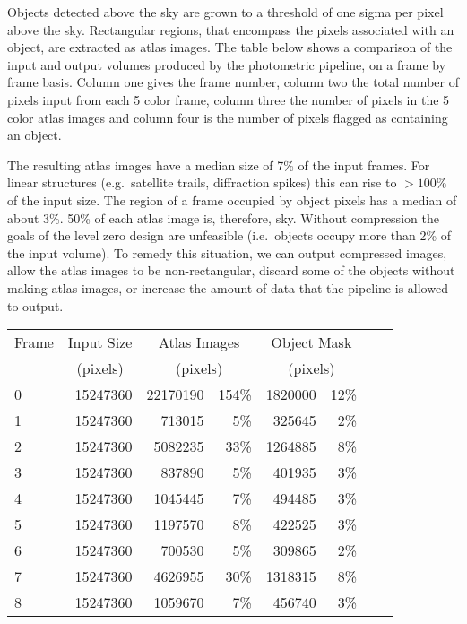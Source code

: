 \begin{itemize}
Objects detected above the sky are grown to a threshold of one sigma
per pixel above the sky. Rectangular regions, that encompass the
pixels associated with an object, are extracted as atlas images. The
table below shows a comparison of the input and output volumes
produced by the photometric pipeline, on a frame by frame basis.
Column one gives the frame number, column two the total number of
pixels input from each 5 color frame, column three the number of
pixels in the 5 color atlas images and column four is the number of
pixels flagged as containing an object.

The resulting atlas images have a median size of 7\% of the input
frames. For linear structures (e.g.\ satellite trails, diffraction
spikes) this can rise to $>100\%$ of the input size. The region of a
frame occupied by object pixels has a median of about 3\%. 50\% of
each atlas image is, therefore, sky. Without compression the goals of
the level zero design are unfeasible (i.e.\ objects occupy more than
2\% of the input volume). To remedy this situation, we can
output compressed images, allow the atlas images to be non-rectangular,
discard some of the objects without making atlas images, or increase
the amount of data that the pipeline is allowed to output.

\begin{tabular}{l|r|rr|rr|rr}
\multicolumn{1}{c|}{Frame} & \multicolumn{1}{c|}{Input Size} & 
\multicolumn{2}{c|}{Atlas Images} & \multicolumn{2}{c|}{Object Mask} \\
      &  \multicolumn{1}{c|}{(pixels)}  & \multicolumn{2}{c|}{(pixels)} & 
\multicolumn{2}{c|}{(pixels)} \\
\hline
\hline
0 & 15247360 & 22170190 & 154\% & 1820000 & 12\% \\
1 & 15247360 & 713015 & 5\% & 325645 & 2\% \\
2 & 15247360 & 5082235 & 33\% & 1264885 & 8\% \\
3 & 15247360 & 837890 & 5\% & 401935 & 3\% \\
4 & 15247360 & 1045445 & 7\% & 494485 & 3\%  \\
5 & 15247360 & 1197570 & 8\% & 422525 & 3\%   \\
6 & 15247360 & 700530 & 5\%  & 309865 & 2\%   \\
7 & 15247360 & 4626955 & 30\% & 1318315 & 8\%  \\
8 & 15247360 & 1059670 & 7\% &456740 & 3\%   \\
\end{tabular}


\end{itemize}
